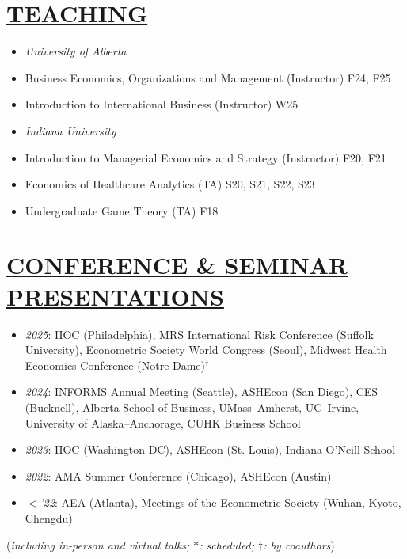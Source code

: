 \documentclass{res}
\begin{document}
\begin{resume}
\section{\large{\ul{TEACHING}}}
\vspace{1.8em}
\begin{itemize}[leftmargin=15pt,labelindent=-15pt,itemindent=-15pt,itemsep=0.1em]
\item[] \textit{University of Alberta}
    \item[] \hspace{13pt} Business Economics, Organizations and Management  (Instructor) \hfill F24, F25
    \item[] \hspace{13pt} Introduction to International Business (Instructor) \hfill W25
\item[] \textit{Indiana University}
    \item[] \hspace{13pt} Introduction to Managerial Economics and Strategy (Instructor) \hfill F20, F21
    \item[] \hspace{13pt} Economics of Healthcare Analytics (TA) \hfill S20, S21, S22, S23
    \item[] \hspace{13pt} Undergraduate Game Theory (TA) \hfill F18
\end{itemize}

\section{\large{\ul{CONFERENCE \& SEMINAR PRESENTATIONS}}}
\vspace{1.8em}
\begin{itemize}[leftmargin=15pt,labelindent=-15pt,itemindent=-15pt,itemsep=0.1em]
\item[] \textit{2025}: IIOC (Philadelphia), MRS International Risk Conference (Suffolk University), Econometric Society World Congress (Seoul), Midwest Health Economics Conference (Notre Dame)$^{\dagger}$
\item[] \textit{2024}: INFORMS Annual Meeting (Seattle), ASHEcon (San Diego), CES (Bucknell), Alberta School of Business, UMass–Amherst, UC–Irvine, University of Alaska–Anchorage, CUHK Business School
\item[] \textit{2023}: IIOC (Washington DC), ASHEcon (St. Louis), Indiana O'Neill School 
\item[] \textit{2022}: AMA Summer Conference (Chicago), ASHEcon (Austin) 
\item[] \textit{$<$'22}: AEA (Atlanta), Meetings of the Econometric Society (Wuhan, Kyoto, Chengdu)
\end{itemize}
\hfill {\small (\textit{including in-person and virtual talks; $*$: scheduled; $\dagger$: by coauthors})}

\end{resume}
\end{document}
